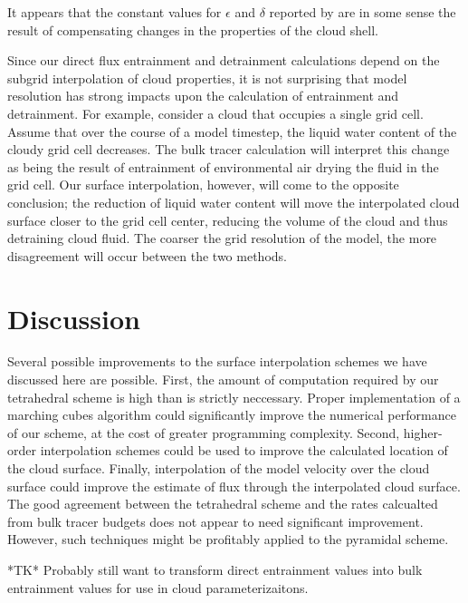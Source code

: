 \documentclass[12pt]{article}
\begin{document}
It appears that the constant values for $\epsilon$ and $\delta$ reported by 
\cite{Brown1999} are in some sense the result of compensating changes in the 
properties of the cloud shell.


Since our direct flux entrainment and detrainment calculations depend on the 
subgrid interpolation of cloud properties, it is not surprising that model 
resolution has strong impacts upon the calculation of entrainment and 
detrainment.  For example, consider a cloud that occupies a single grid cell.  
Assume that over the course of a model timestep, the liquid water content of 
the cloudy grid cell decreases.  The bulk tracer calculation will interpret 
this change as being the result of entrainment of environmental air drying the 
fluid in the grid cell.  Our surface interpolation, however, will come to the 
opposite conclusion; the reduction of liquid water content will move the 
interpolated cloud surface closer to the grid cell center, reducing the volume 
of the cloud and thus detraining cloud fluid.  The coarser the grid resolution 
of the model, the more disagreement will occur between the two methods.




\section{Discussion}

Several possible improvements to the surface interpolation schemes we have 
discussed here are possible.  First, the amount of computation required by our 
tetrahedral scheme is high than is strictly neccessary.  Proper implementation
of a marching cubes algorithm could significantly improve the numerical 
performance of our scheme, at the cost of greater programming complexity.
Second, higher-order interpolation schemes could be used to improve the
calculated location of the cloud surface.  Finally, interpolation of the model 
velocity over the cloud surface could improve the estimate of flux through the 
interpolated cloud surface.  The good agreement between the tetrahedral scheme
and the rates calcualted from bulk tracer budgets does not appear to need 
significant improvement.  However, such techniques might be profitably applied
to the pyramidal scheme.

*TK* Probably still want to transform direct entrainment values into bulk 
entrainment values for use in cloud parameterizaitons.
\end{document}
